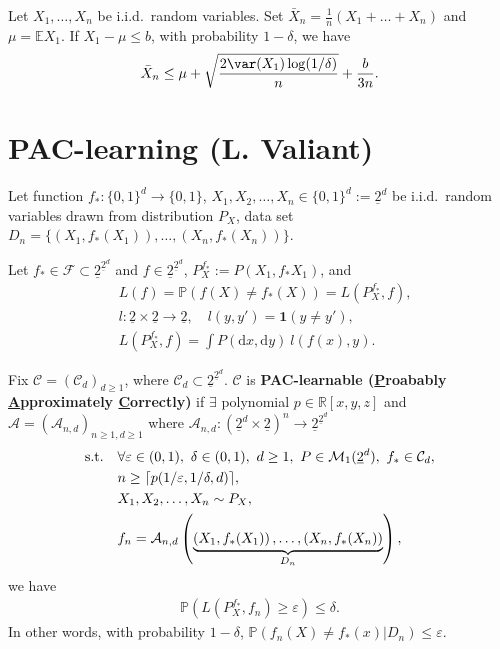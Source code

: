 \documentclass[twoside]{article}
\begin{document}
\begin{theorem}
    Let $X_1,\ldots, X_n$ be i.i.d.\ random variables. Set $\bar{X}_n=\frac{1}{n}(X_1+\ldots+X_n)$ and $\mu = \mathbb{E}X_1$.  If $X_1-\mu \le b$, with probability $1-\delta$, we have
    \begin{align*}
        \bar{X}_n \le \mu + \sqrt{ \frac{ 2 \var(X_1) \log(1/\delta) }{n} } + \frac{b}{3n}.
    \end{align*}
    
\end{theorem}

\section{PAC-learning (L. Valiant)}

Let function  $f_*: \{0,1\}^d \rightarrow \{0,1\}$, $ X_1, X_2, \ldots, X_n \in \{0,1\}^d := \underline{2}^d$ be i.i.d.\ random variables drawn from distribution $P_X$, data set $D_n=\{ \left( X_1, f_*(X_1)\right), \ldots, \left( X_n, f_*(X_n)\right) \}$.

Let $f_* \in \mathcal{F} \subset \underline{2}^{ \underline{2}^d } $ and $f \in \underline{2}^{ \underline{2}^d } $, $P_X^{f_*}:= P(X_1, f_*{X_1})$, and 
\begin{align*}
    & L(f) = \mathbb{P} \left( f(X) \ne f_*(X) \right) = L( P_X^{f_*} ,f ),\\
    & l: \underline{2} \times \underline{2} \rightarrow \underline{2}, \quad l(y,y') = \mathbf{1}(y\ne y'),\\
    & L( P_X^{f_*},f  ) = \int P(\mathrm{d}x, \mathrm{d}y) \ l( f(x),y ).
\end{align*}

\begin{definition}
    Fix $\mathcal{C} = (\mathcal{C}_d)_{d\ge 1}$, where $\mathcal{C}_d \subset \underline{2}^{\underline{2}^d }$. $\mathcal{C}$ is \textbf{PAC-learnable (\underline{P}roabably \underline{A}pproximately \underline{C}orrectly)} if $\exists$ polynomial $p\in \mathbb{R}[x,y,z]$ and $\mathcal{A}= (\mathcal{A}_{n,d})_{n\ge 1, d\ge 1}$ where $\mathcal{A}_{n,d}:\left( \underline{2}^d\times \underline{2} \right)^n \rightarrow  \underline{2}^{ \underline{2}^d }$
    \begin{align*}
        \text{s.t.\quad }
        & \forall  \varepsilon \in (0,1), \ \delta \in(0,1), \ d\ge 1, \ P \in \mathcal{M}_1(\underline{2}^d),\  f_* \in \mathcal{C}_d,\\
        & n\ge \lceil p( 1/\varepsilon, 1/\delta, d )\rceil,\\
        & X_1,X_2,\ldots,X_n\sim P_X,\\
        & f_n = \mathcal{A}_{n,d} \left( \underbrace{\left( X_1, f_*(X_1)\right), \ldots, \left( X_n, f_*(X_n)\right)}_{D_n} \right),
    \end{align*}
    we have
    \begin{align*}
        \mathbb{P}\left( L\left( P_X^{f_*},f_n \right) \ge \varepsilon  \right) \le \delta.
    \end{align*}
    In other words, with probability $1-\delta$, $\mathbb{P} \left( f_n(X) \ne f_*(x) | D_n \right) \le \varepsilon$.
\end{definition} 
\end{document}
